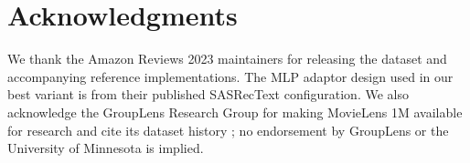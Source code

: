 \section{Acknowledgments}\label{sec:9}

We thank the Amazon Reviews 2023 maintainers \citep{hou2024blair} for releasing the dataset and accompanying reference implementations. The MLP adaptor design used in our best variant is from their published SASRecText configuration. We also acknowledge the GroupLens Research Group for making MovieLens 1M available for research and cite its dataset history \citep{harper2015movielens}; no endorsement by GroupLens or the University of Minnesota is implied.

